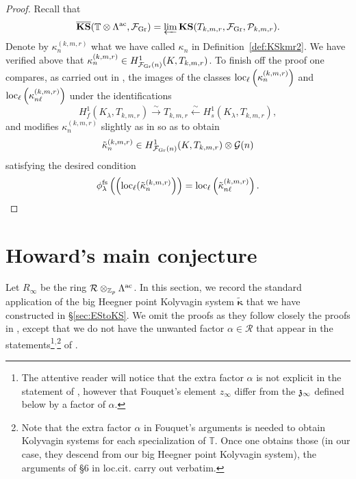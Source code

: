 \documentclass[12pt]{amsart}
\numberwithin{equation}{section}
\begin{document}
\begin{proof}
Recall that 
$$\overline{\textup{\textbf{KS}}}({\mathbb{T}}\otimes{\Lambda}^{\textup{ac}},{\mathcal{F}}_{\textup{Gr}})=\varprojlim {\textup{\textbf{KS}}}(T_{k,m,r},{\mathcal{F}}_{\textup{Gr}},{\mathcal{P}}_{k,m,r}).$$
Denote by $\kappa_n^{(k,m,r)}$ what we have called $\kappa_n$  in Definition~\ref{def:KSkmr2}. We have verified above that $\kappa_n^{(k,m,r)} \in H^1_{{\mathcal{F}}_\textup{Gr}(n)}(K,T_{k,m,r})$. To finish off the proof one compares, as carried out in \cite[\S7]{nek92}, the images of the classes $\textup{loc}_{\ell}\left(\kappa_n^{(k,m,r)}\right)$ and $\textup{loc}_{\ell}\left(\kappa_{n\ell}^{(k,m,r)}\right)$ under the identifications
\begin{equation}
\label{eqn:fsexplicit}
H^1_f(K_\lambda,T_{k,m,r}) \stackrel{\sim}{\longrightarrow} T_{k,m,r} \stackrel{\sim}{\longleftarrow} H^1_{s}(K_\lambda,T_{k,m,r}),
\end{equation}
  and modifies $\kappa_{n}^{(k,m,r)}$ slightly as in \cite[Theorem 1.7.5]{howard-heegner1} so as to obtain 
  $$\tilde{\kappa}_{n}^{(k,m,r)} \in H^1_{{\mathcal{F}}_{\textup{Gr}}(n)}(K,T_{k,m,r})\otimes \mathcal{G}(n)$$
   satisfying the desired condition
$$\phi_\lambda^{\textup{fs}}\left(\left(\textup{loc}_\ell(\tilde{\kappa}_{n}^{(k,m,r)}\right)\right)=\textup{loc}_\ell\left(\tilde{\kappa}_{n\ell}^{(k,m,r)}\right).$$ 

\end{proof}
\section{Howard's main conjecture}
Let $R_\infty$ be the ring ${\mathcal{R}}\otimes_{{\mathbb{Z}}_p}{\Lambda}^{\textup{ac}}$. In this section, we record the standard application of the big Heegner point Kolyvagin system $\pmb{\tilde{\kappa}}$ that we have constructed in \S\ref{sec:EStoKS}. We omit the proofs as they follow closely the proofs in \cite[\S6.3]{fouquetRIMS}, except that we do not have the unwanted factor $\alpha \in {\mathcal{R}}$ that appear in the statements\footnote{The attentive reader will notice that the extra factor $\alpha$ is not explicit in the statement of \cite[Theorem B(iii)]{fouquetRIMS}, however that Fouquet's element $z_\infty$ differ from the $\frak{z}_{\infty}$ defined below by a factor of $\alpha$.}${}^{,}$\footnote{Note that the extra factor $\alpha$ in Fouquet's\cite{fouquetRIMS} arguments is needed to obtain Kolyvagin systems for each specialization of ${\mathbb{T}}$. Once one obtains those (in our case, they descend from our big Heegner point Kolyvagin system), the arguments of \S6 in loc.cit. carry out verbatim.} of \cite[Theorem B(iii), Theorem 3]{fouquetRIMS}.
\end{document}

